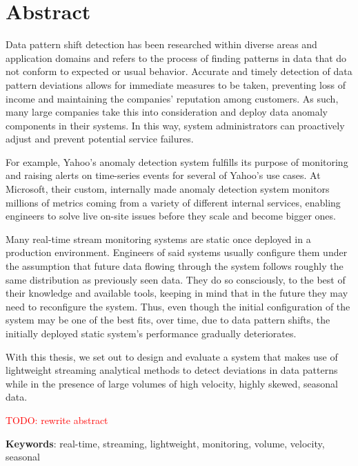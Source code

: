 \chapter*{Abstract}

Data pattern shift detection has been researched within diverse areas and application domains and refers to the process of finding patterns in data that do not conform to expected or usual behavior. Accurate and timely detection of data pattern deviations allows for immediate measures to be taken, preventing loss of income and maintaining the companies' reputation among customers.
As such, many large companies take this into consideration and deploy data anomaly components in their systems. In this way, system administrators can proactively adjust and prevent potential service failures.

For example, Yahoo's anomaly detection system fulfills its purpose of monitoring and raising alerts on time-series events for several of Yahoo's use cases. At Microsoft, their custom, internally made anomaly detection system monitors millions of metrics coming from a variety of different internal services, enabling engineers to solve live on-site issues before they scale and become bigger ones.

Many real-time stream monitoring systems are static once deployed in a production environment. Engineers of said systems usually configure them under the assumption that future data flowing through the system follows roughly the same distribution as previously seen data. They do so consciously, to the best of their knowledge and available tools, keeping in mind that in the future they may need to reconfigure the system. Thus, even though the initial configuration of the system may be one of the best fits, over time, due to data pattern shifts, the initially deployed static system's performance gradually deteriorates.

With this thesis, we set out to design and evaluate a system that makes use of lightweight streaming analytical methods to detect deviations in data patterns while in the presence of large volumes of high velocity, highly skewed, seasonal data. 

\textcolor{red}{TODO: rewrite abstract}

\vspace*{10mm}\noindent
\textbf{Keywords}: real-time, streaming, lightweight, monitoring, volume, velocity, seasonal


